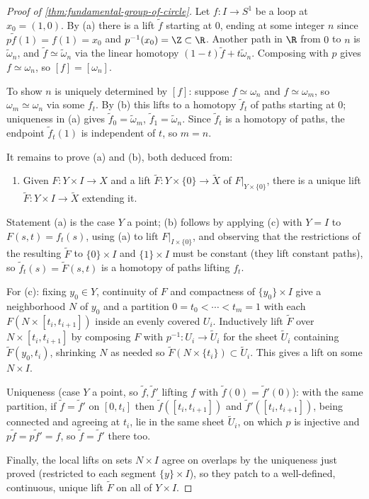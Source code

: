 \begin{proof}[Proof of \cref{thm:fundamental-group-of-circle}]
Let $f : I \to S^1$ be a loop at $x_0 = (1,0)$. By (a) there is a lift $\tilde f$ starting at
$0$, ending at some integer $n$ since $p\tilde f(1) = f(1) = x_0$ and $p^{-1}(x_0) = \Z \subset \R$.
Another path in $\R$ from $0$ to $n$ is $\tilde\omega_n$, and $\tilde f \simeq \tilde\omega_n$ via the linear homotopy
$(1-t)\tilde f + t\tilde\omega_n$. Composing with $p$ gives $f \simeq \omega_n$, so $[f] = [\omega_n]$.

To show $n$ is uniquely determined by $[f]$: suppose $f \simeq \omega_n$ and $f \simeq \omega_m$, so
$\omega_m \simeq \omega_n$ via some $f_t$. By (b) this lifts to a homotopy $\tilde f_t$ of paths starting at
$0$; uniqueness in (a) gives $\tilde f_0 = \tilde\omega_m$, $\tilde f_1 = \tilde\omega_n$. Since $\tilde f_t$ is a homotopy of
paths, the endpoint $\tilde f_t(1)$ is independent of $t$, so $m = n$.

It remains to prove (a) and (b), both deduced from:
\begin{enumerate}
\item[(c)] Given $F : Y \times I \to X$ and a lift $\tilde F : Y \times \{0\} \to \tilde X$ of
$F|_{Y\times\{0\}}$, there is a unique lift $\tilde F : Y \times I \to \tilde X$ extending it.
\end{enumerate}
Statement (a) is the case $Y$ a point; (b) follows by applying (c) with $Y = I$ to
$F(s,t) = f_t(s)$, using (a) to lift $F|_{I \times \{0\}}$, and observing that the restrictions of
the resulting $\tilde F$ to $\{0\}\times I$ and $\{1\}\times I$ must be constant (they lift constant
paths), so $\tilde f_t(s) = \tilde F(s,t)$ is a homotopy of paths lifting $f_t$.

For (c): fixing $y_0 \in Y$, continuity of $F$ and compactness of $\{y_0\}\times I$ give a
neighborhood $N$ of $y_0$ and a partition $0=t_0<\cdots<t_m=1$ with each
$F(N\times[t_i,t_{i+1}])$ inside an evenly covered $U_i$. Inductively lift $\tilde F$ over
$N\times[t_i,t_{i+1}]$ by composing $F$ with $p^{-1}: U_i \to \tilde U_i$ for the sheet $\tilde U_i$
containing $\tilde F(y_0,t_i)$, shrinking $N$ as needed so $\tilde F(N\times\{t_i\}) \subset \tilde U_i$. This
gives a lift on some $N \times I$.

Uniqueness (case $Y$ a point, so $\tilde f, \tilde f'$ lifting $f$ with $\tilde f(0)=\tilde f'(0)$): with the
same partition, if $\tilde f = \tilde f'$ on $[0,t_i]$ then $\tilde f([t_i,t_{i+1}])$ and $\tilde f'([t_i,t_{i+1}])$,
being connected and agreeing at $t_i$, lie in the same sheet $\tilde U_i$, on which $p$ is
injective and $p\tilde f = p\tilde f' = f$, so $\tilde f = \tilde f'$ there too.

Finally, the local lifts on sets $N \times I$ agree on overlaps by the uniqueness just
proved (restricted to each segment $\{y\}\times I$), so they patch to a well-defined,
continuous, unique lift $\tilde F$ on all of $Y \times I$.
\end{proof}


